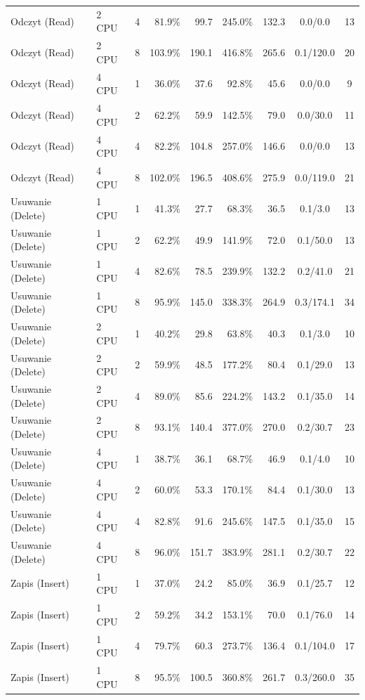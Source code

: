 \begin{table}[ht]
{\begin{tabular}{llcrrrrcc}
Odczyt (Read) & 2 CPU & 4 & 81.9\% & 99.7 & 245.0\% & 132.3 & 0.0/0.0 & 13 \\
Odczyt (Read) & 2 CPU & 8 & 103.9\% & 190.1 & 416.8\% & 265.6 & 0.1/120.0 & 20 \\
Odczyt (Read) & 4 CPU & 1 & 36.0\% & 37.6 & 92.8\% & 45.6 & 0.0/0.0 & 9 \\
Odczyt (Read) & 4 CPU & 2 & 62.2\% & 59.9 & 142.5\% & 79.0 & 0.0/30.0 & 11 \\
Odczyt (Read) & 4 CPU & 4 & 82.2\% & 104.8 & 257.0\% & 146.6 & 0.0/0.0 & 13 \\
Odczyt (Read) & 4 CPU & 8 & 102.0\% & 196.5 & 408.6\% & 275.9 & 0.0/119.0 & 21 \\
Usuwanie (Delete) & 1 CPU & 1 & 41.3\% & 27.7 & 68.3\% & 36.5 & 0.1/3.0 & 13 \\
Usuwanie (Delete) & 1 CPU & 2 & 62.2\% & 49.9 & 141.9\% & 72.0 & 0.1/50.0 & 13 \\
Usuwanie (Delete) & 1 CPU & 4 & 82.6\% & 78.5 & 239.9\% & 132.2 & 0.2/41.0 & 21 \\
Usuwanie (Delete) & 1 CPU & 8 & 95.9\% & 145.0 & 338.3\% & 264.9 & 0.3/174.1 & 34 \\
Usuwanie (Delete) & 2 CPU & 1 & 40.2\% & 29.8 & 63.8\% & 40.3 & 0.1/3.0 & 10 \\
Usuwanie (Delete) & 2 CPU & 2 & 59.9\% & 48.5 & 177.2\% & 80.4 & 0.1/29.0 & 13 \\
Usuwanie (Delete) & 2 CPU & 4 & 89.0\% & 85.6 & 224.2\% & 143.2 & 0.1/35.0 & 14 \\
Usuwanie (Delete) & 2 CPU & 8 & 93.1\% & 140.4 & 377.0\% & 270.0 & 0.2/30.7 & 23 \\
Usuwanie (Delete) & 4 CPU & 1 & 38.7\% & 36.1 & 68.7\% & 46.9 & 0.1/4.0 & 10 \\
Usuwanie (Delete) & 4 CPU & 2 & 60.0\% & 53.3 & 170.1\% & 84.4 & 0.1/30.0 & 13 \\
Usuwanie (Delete) & 4 CPU & 4 & 82.8\% & 91.6 & 245.6\% & 147.5 & 0.1/35.0 & 15 \\
Usuwanie (Delete) & 4 CPU & 8 & 96.0\% & 151.7 & 383.9\% & 281.1 & 0.2/30.7 & 22 \\
Zapis (Insert) & 1 CPU & 1 & 37.0\% & 24.2 & 85.0\% & 36.9 & 0.1/25.7 & 12 \\
Zapis (Insert) & 1 CPU & 2 & 59.2\% & 34.2 & 153.1\% & 70.0 & 0.1/76.0 & 14 \\
Zapis (Insert) & 1 CPU & 4 & 79.7\% & 60.3 & 273.7\% & 136.4 & 0.1/104.0 & 17 \\
Zapis (Insert) & 1 CPU & 8 & 95.5\% & 100.5 & 360.8\% & 261.7 & 0.3/260.0 & 35 \\

\end{tabular}}
\end{table}
